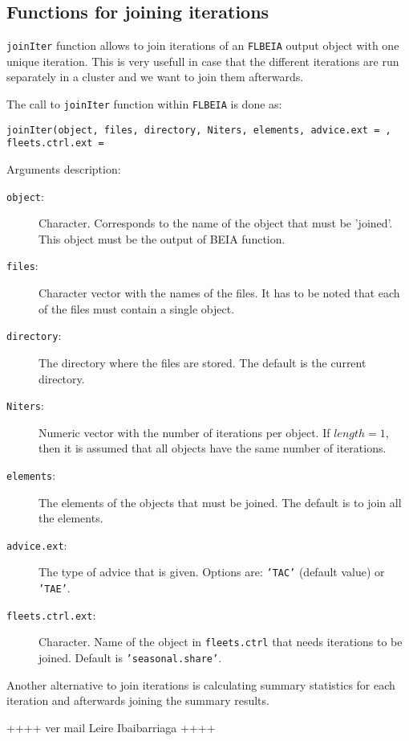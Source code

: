   
\subsection{Functions for joining iterations}

  \texttt{joinIter} function allows to join iterations of an \texttt{FLBEIA} output object with one unique iteration.
  This is very usefull in case that the different iterations are run separately in a cluster and we want to join them afterwards.
  
  The call to \texttt{joinIter} function within \texttt{FLBEIA} is done as:
	
	\begin{center}
		\texttt{joinIter(object, files, directory, Niters, elements, advice.ext = , fleets.ctrl.ext = } 
	\end{center}

  \noindent Arguments description:
	\begin{description}
		\item[\texttt{object}:] Character. Corresponds to the name of the object that must be 'joined'. 
		  This object must be the output of BEIA function.
		\item[\texttt{files}:] Character vector with the names of the files.
		  It has to be noted that each of the files must contain a single object.
		\item[\texttt{directory}:] The directory where the files are stored. The default is the current directory.
		\item[\texttt{Niters}:] Numeric vector with the number of iterations per object. 
		  If $length = 1$, then it is assumed that all objects have the same number of iterations.
		\item[\texttt{elements}:] The elements of the objects that must be joined. The default is to join all the elements.
		\item[\texttt{advice.ext}:] The type of advice that is given. Options are: \texttt{'TAC'} (default value) or \texttt{'TAE'}.
		\item[\texttt{fleets.ctrl.ext}:] Character. Name of the object in \texttt{fleets.ctrl} that needs iterations to be joined.
		  Default is \texttt{'seasonal.share'}.
	\end{description}

  Another alternative to join iterations is calculating summary statistics for each iteration and afterwards joining the summary results.
  
  ++++ ver mail Leire Ibaibarriaga ++++
  
  
